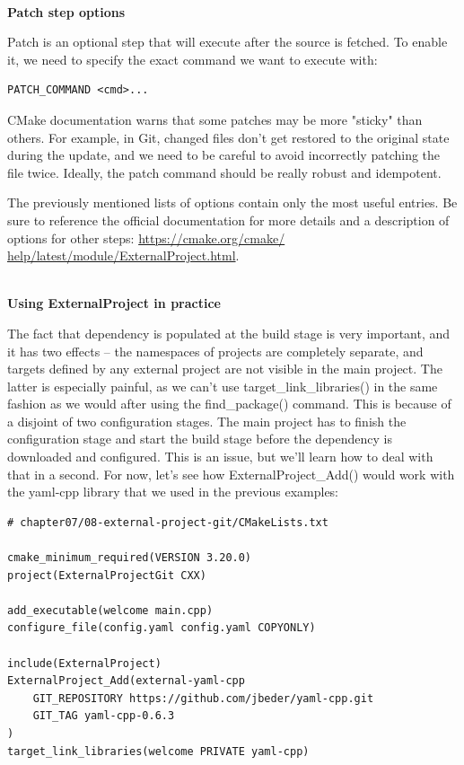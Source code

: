 \hspace*{\fill} \\ %
\noindent
\textbf{Patch step options}

Patch is an optional step that will execute after the source is fetched. To enable it, we need to specify the exact command we want to execute with:

\begin{lstlisting}[style=styleCMake]
PATCH_COMMAND <cmd>...
\end{lstlisting} 

CMake documentation warns that some patches may be more "sticky" than others. For example, in Git, changed files don't get restored to the original state during the update, and we need to be careful to avoid incorrectly patching the file twice. Ideally, the patch command should be really robust and idempotent.

\begin{tcolorbox}[colback=blue!5!white,colframe=blue!75!black,title=Important Note]
The previously mentioned lists of options contain only the most useful entries. Be sure to reference the official documentation for more details and a description of options for other steps: \url{https://cmake.org/cmake/ help/latest/module/ExternalProject.html}.
\end{tcolorbox}

\hspace*{\fill} \\ %
\noindent
\textbf{Using ExternalProject in practice}

The fact that dependency is populated at the build stage is very important, and it has two effects – the namespaces of projects are completely separate, and targets defined by any external project are not visible in the main project. The latter is especially painful, as we can't use target\_link\_libraries() in the same fashion as we would after using the find\_package() command. This is because of a disjoint of two configuration stages. The main project has to finish the configuration stage and start the build stage before the dependency is downloaded and configured. This is an issue, but we'll learn how to deal with that in a second. For now, let's see how ExternalProject\_Add() would work with the yaml-cpp library that we used in the previous examples:

\begin{lstlisting}[style=styleCMake]
# chapter07/08-external-project-git/CMakeLists.txt

cmake_minimum_required(VERSION 3.20.0)
project(ExternalProjectGit CXX)

add_executable(welcome main.cpp)
configure_file(config.yaml config.yaml COPYONLY)

include(ExternalProject)
ExternalProject_Add(external-yaml-cpp
	GIT_REPOSITORY https://github.com/jbeder/yaml-cpp.git
	GIT_TAG yaml-cpp-0.6.3
)
target_link_libraries(welcome PRIVATE yaml-cpp)
\end{lstlisting} 


